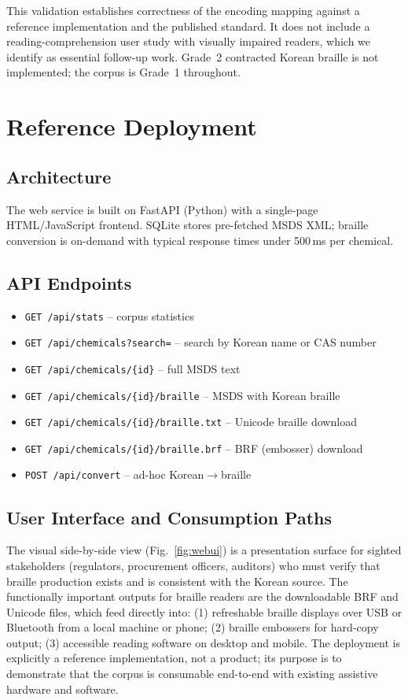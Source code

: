\documentclass[journal]{IEEEtran}
\begin{document}
This validation establishes correctness of the encoding mapping against a reference implementation and the published standard. It does not include a reading-comprehension user study with visually impaired readers, which we identify as essential follow-up work. Grade~2 contracted Korean braille is not implemented; the corpus is Grade~1 throughout.

\section{Reference Deployment}
\label{sec:webservice}

\subsection{Architecture}

The web service is built on FastAPI (Python) with a single-page HTML/JavaScript frontend. SQLite stores pre-fetched MSDS XML; braille conversion is on-demand with typical response times under 500\,ms per chemical.

\subsection{API Endpoints}

\begin{itemize}
\item \texttt{GET /api/stats} -- corpus statistics
\item \texttt{GET /api/chemicals?search=} -- search by Korean name or CAS number
\item \texttt{GET /api/chemicals/\{id\}} -- full MSDS text
\item \texttt{GET /api/chemicals/\{id\}/braille} -- MSDS with Korean braille
\item \texttt{GET /api/chemicals/\{id\}/braille.txt} -- Unicode braille download
\item \texttt{GET /api/chemicals/\{id\}/braille.brf} -- BRF (embosser) download
\item \texttt{POST /api/convert} -- ad-hoc Korean$\rightarrow$braille
\end{itemize}

\subsection{User Interface and Consumption Paths}

The visual side-by-side view (Fig.~\ref{fig:webui}) is a presentation surface for sighted stakeholders (regulators, procurement officers, auditors) who must verify that braille production exists and is consistent with the Korean source. The functionally important outputs for braille readers are the downloadable BRF and Unicode files, which feed directly into: (1) refreshable braille displays over USB or Bluetooth from a local machine or phone; (2) braille embossers for hard-copy output; (3) accessible reading software on desktop and mobile. The deployment is explicitly a reference implementation, not a product; its purpose is to demonstrate that the corpus is consumable end-to-end with existing assistive hardware and software.
\end{document}
